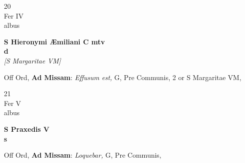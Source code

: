 \documentclass[10pt, openany]{book}
\begin{document}
        \begin{center}
            \begin{minipage}{3.5in}
                \vspace{2em}
                \begin{minipage}{0.5in}
                    {\Huge 20} \\
                    {\normalsize Fer IV} \\
                    {\normalsize albus}
                \end{minipage}
                \begin{minipage}{3.0in}
                    \textbf{ \large S Hieronymi Æmiliani C mtv \\
                    \textnormal{\normalsize d}} \\ \textit{[S Margaritae VM]} \\ 
                \end{minipage}
                \begin{justify}Off Ord, \textbf{Ad Missam}: \textit{Effusum est,} G, Pre Communis, 2 or S Margaritae VM,  
                \end{justify}
            \end{minipage}
        \end{center}
    
        \begin{center}
            \begin{minipage}{3.5in}
                \vspace{2em}
                \begin{minipage}{0.5in}
                    {\Huge 21} \\
                    {\normalsize Fer V} \\
                    {\normalsize albus}
                \end{minipage}
                \begin{minipage}{3.0in}
                    \textbf{ \large S Praxedis V \\
                    \textnormal{\normalsize s}} \\ 
                \end{minipage}
                \begin{justify}Off Ord, \textbf{Ad Missam}: \textit{Loquebar,} G, Pre Communis,  
                \end{justify}
            \end{minipage}
        \end{center}
    
\end{document}
